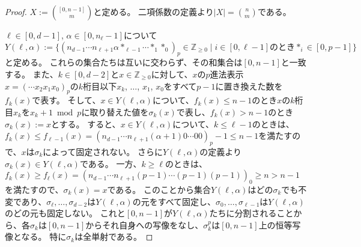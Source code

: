 ﻿\documentclass{ltjsarticle}
\theoremstyle{definition}
\begin{document}
\begin{proof}
    $X := \binom{[0,n-1]}{m}$と定める。
    二項係数の定義より$|X| = \binom{n}{m}$である。

    $\ell \in [0,d-1]$, $\alpha \in [0,n_{\ell}-1]$について
    \[
        Y(\ell, \alpha) := \{ (n_{d-1} \cdots n_{\ell+1} \alpha *_{\ell-1} \cdots *_1 *_0)_p \in \mathbb{Z}_{\geq 0} \mid \mbox{$i \in [0,\ell-1]$のとき$*_i \in [0,p-1]$} \}
    \]
    と定める。
    これらの集合たちは互いに交わらず、その和集合は$[0,n-1]$と一致する。
    また、$k \in [0,d-2]$と$x \in \mathbb{Z}_{\geq 0}$に対して、$x$の$p$進法表示$x = (\cdots x_2 x_1 x_0)_p$の$k$桁目以下$x_k$, $\dots$, $x_1$, $x_0$をすべて$p-1$に置き換えた数を$f_k(x)$で表す。
    そして、$x \in Y(\ell,\alpha)$について、$f_k(x) \leq n-1$のとき$x$の$k$桁目$x_k$を$x_k + 1 \bmod p$に取り替えた値を$\sigma_k(x)$で表し、$f_k(x) > n-1$のとき$\sigma_k(x) := x$とする。
    すると、$x \in Y(\ell,\alpha)$について、$k \leq \ell-1$のときは、$f_k(x) \leq f_{\ell-1}(x) = (n_{d-1} \cdots n_{\ell+1} (\alpha+1) 0 \cdots 00)_p - 1 \leq n-1$を満たすので、$x$は$\sigma_k$によって固定されない。
    さらに$Y(\ell,\alpha)$の定義より$\sigma_k(x) \in Y(\ell,\alpha)$である。
    一方、$k \geq \ell$のときは、$f_k(x) \geq f_{\ell}(x) = (n_{d-1} \cdots n_{\ell+1} (p-1) \cdots (p-1)(p-1))_0 \geq n > n-1$を満たすので、$\sigma_k(x) = x$である。
    このことから集合$Y(\ell,\alpha)$はどの$\sigma_k$でも不変であり、$\sigma_{\ell},\dots,\sigma_{d-2}$は$Y(\ell,\alpha)$の元をすべて固定し、$\sigma_0,\dots,\sigma_{\ell-1}$は$Y(\ell,\alpha)$のどの元も固定しない。
    これと$[0,n-1]$が$Y(\ell,\alpha)$たちに分割されることから、各$\sigma_k$は$[0,n-1]$からそれ自身への写像をなし、$\sigma_k^p$は$[0,n-1]$上の恒等写像となる。
    特に$\sigma_k$は全単射である。


\end{proof}
\end{document}

